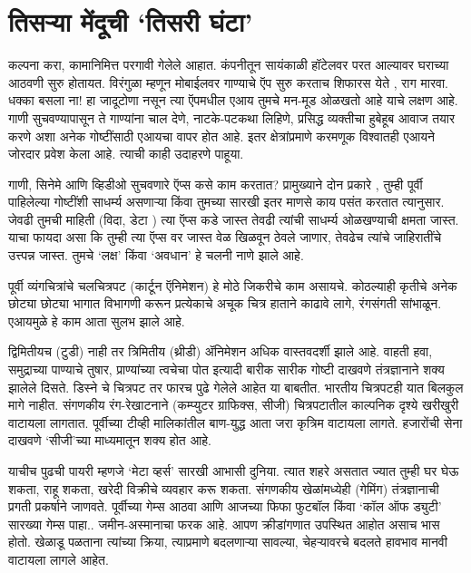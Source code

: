 \chapter{तिसऱ्या मेंदूची `तिसरी घंटा'}

कल्पना करा, कामानिमित्त परगावी गेलेले आहात. कंपनीतून सायंकाळी हॉटेलवर परत आल्यावर घराच्या आठवणी सुरु होतायत. विरंगुळा म्हणून मोबाईलवर गाण्याचे ऍप सुरु करताच शिफारस येते , राग मारवा.  धक्का बसला ना! हा जादूटोणा नसून त्या ऍपमधील एआय तुमचे मन-मूड ओळखतो आहे याचे लक्षण आहे. गाणी सुचवण्यापासून ते गाण्यांना चाल देणे, नाटके-पटकथा लिहिणे, प्रसिद्ध व्यक्तीचा हुबेहूब आवाज तयार करणे अशा अनेक गोष्टींसाठी एआयचा वापर होत आहे. इतर क्षेत्रांप्रमाणे करमणूक विश्वातही एआयने जोरदार प्रवेश केला आहे. त्याची काही उदाहरणे पाहूया.

गाणी, सिनेमे आणि व्हिडीओ सुचवणारे ऍप्स कसे काम करतात? प्रामुख्याने दोन प्रकारे , तुम्ही पूर्वी पाहिलेल्या गोष्टींशी साधर्म्य असणाऱ्या किंवा तुमच्या सारखी इतर माणसे काय पसंत करतात त्यानुसार. जेवढी तुमची माहिती (विदा, डेटा ) त्या ऍप्स कडे जास्त तेवढी त्यांची साधर्म्य ओळखण्याची क्षमता जास्त. याचा फायदा असा कि तुम्ही त्या ऍप्स वर जास्त वेळ खिळवून ठेवले जाणार, तेवढेच त्यांचे जाहिरातींचे उत्त्पन्न जास्त. तुमचे `लक्ष' किंवा `अवधान' हे चलनी नाणे झाले आहे.  

पूर्वी व्यंगचित्रांचे चलचित्रपट (कार्टून ऍनिमेशन) हे मोठे जिकरीचे काम असायचे. कोठल्याही कृतीचे अनेक छोट्या छोट्या भागात विभागणी करून प्रत्येकाचे अचूक चित्र हाताने काढावे लागे, रंगसंगती सांभाळून. एआयमुळे हे काम आता सुलभ झाले आहे. 

द्विमितीयच (टुडी) नाही तर त्रिमितीय (थ्रीडी) ॲनिमेशन अधिक वास्तवदर्शी झाले आहे. वाहती हवा, समुद्राच्या पाण्याचे तुषार, प्राण्यांच्या त्वचेचा पोत इत्यादी बारीक सारीक गोष्टी दाखवणे तंत्रज्ञानाने शक्य झालेले दिसते. डिस्ने चे चित्रपट तर फारच पुढे गेलेले आहेत या बाबतीत.  भारतीय चित्रपटही यात बिलकुल मागे नाहीत. संगणकीय रंग-रेखाटनाने (कम्प्युटर ग्राफिक्स, सीजी) चित्रपटातील काल्पनिक दृश्ये खरीखुरी वाटायला लागतात. पूर्वीच्या टीव्ही मालिकांतील बाण-युद्ध आता जरा कृत्रिम वाटायला लागते. हजारोंची सेना दाखवणे `सीजी'च्या माध्यमातून शक्य होत आहे. 

याचीच पुढची पायरी म्हणजे `मेटा व्हर्स' सारखी आभासी दुनिया. त्यात शहरे असतात ज्यात तुम्ही घर घेऊ शकता, राहू शकता, खरेदी विक्रीचे व्यवहार करू शकता.  संगणकीय खेळांमध्येही (गेमिंग) तंत्रज्ञानाची प्रगती प्रकर्षाने जाणवते. पूर्वीच्या गेम्स आठवा आणि आजच्या फिफा फुटबॉल किंवा `कॉल ऑफ ड्युटी' सारख्या गेम्स पाहा.. जमीन-अस्मानाचा फरक आहे. आपण क्रीडांगणात उपस्थित आहोत असाच भास होतो. खेळाडू पळताना त्यांच्या क्रिया, त्याप्रमाणे बदलणाऱ्या सावल्या, चेहऱ्यावरचे बदलते हावभाव मानवी वाटायला लागले आहेत.

